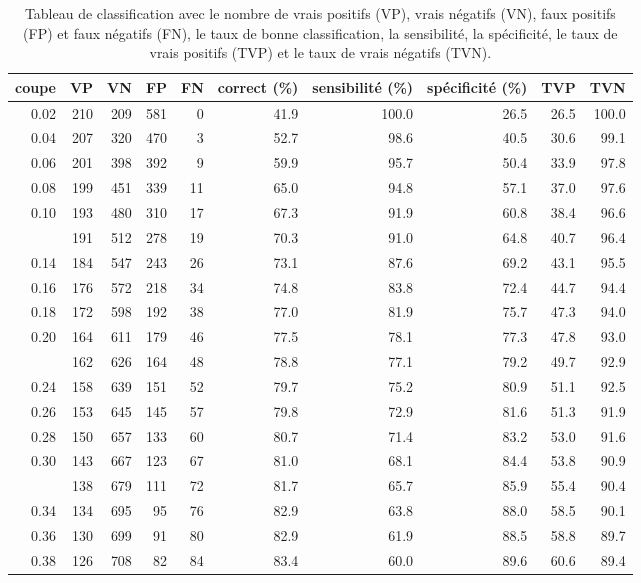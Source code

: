 \documentclass[
  11pt,
  letterpaper,
]{book}
\theoremstyle{definition}
\theoremstyle{remark}
\begin{document}
\hypertarget{tbl-classification-loocv}{}
\begin{longtable}{rrrrrrrrrr}
\caption{\label{tbl-classification-loocv}Tableau de classification avec le nombre de vrais positifs (VP), vrais
négatifs (VN), faux positifs (FP) et faux négatifs (FN), le taux de
bonne classification, la sensibilité, la spécificité, le taux de vrais
positifs (TVP) et le taux de vrais négatifs (TVN). }\tabularnewline

\toprule
coupe & VP & VN & FP & FN & correct (\%) & sensibilité (\%) & spécificité (\%) & TVP & TVN\\
\midrule
0.02 & 210 & 209 & 581 & 0 & 41.9 & 100.0 & 26.5 & 26.5 & 100.0\\
0.04 & 207 & 320 & 470 & 3 & 52.7 & 98.6 & 40.5 & 30.6 & 99.1\\
0.06 & 201 & 398 & 392 & 9 & 59.9 & 95.7 & 50.4 & 33.9 & 97.8\\
0.08 & 199 & 451 & 339 & 11 & 65.0 & 94.8 & 57.1 & 37.0 & 97.6\\
0.10 & 193 & 480 & 310 & 17 & 67.3 & 91.9 & 60.8 & 38.4 & 96.6\\
\addlinespace
0.12 & 191 & 512 & 278 & 19 & 70.3 & 91.0 & 64.8 & 40.7 & 96.4\\
0.14 & 184 & 547 & 243 & 26 & 73.1 & 87.6 & 69.2 & 43.1 & 95.5\\
0.16 & 176 & 572 & 218 & 34 & 74.8 & 83.8 & 72.4 & 44.7 & 94.4\\
0.18 & 172 & 598 & 192 & 38 & 77.0 & 81.9 & 75.7 & 47.3 & 94.0\\
0.20 & 164 & 611 & 179 & 46 & 77.5 & 78.1 & 77.3 & 47.8 & 93.0\\
\addlinespace
0.22 & 162 & 626 & 164 & 48 & 78.8 & 77.1 & 79.2 & 49.7 & 92.9\\
0.24 & 158 & 639 & 151 & 52 & 79.7 & 75.2 & 80.9 & 51.1 & 92.5\\
0.26 & 153 & 645 & 145 & 57 & 79.8 & 72.9 & 81.6 & 51.3 & 91.9\\
0.28 & 150 & 657 & 133 & 60 & 80.7 & 71.4 & 83.2 & 53.0 & 91.6\\
0.30 & 143 & 667 & 123 & 67 & 81.0 & 68.1 & 84.4 & 53.8 & 90.9\\
\addlinespace
0.32 & 138 & 679 & 111 & 72 & 81.7 & 65.7 & 85.9 & 55.4 & 90.4\\
0.34 & 134 & 695 & 95 & 76 & 82.9 & 63.8 & 88.0 & 58.5 & 90.1\\
0.36 & 130 & 699 & 91 & 80 & 82.9 & 61.9 & 88.5 & 58.8 & 89.7\\
0.38 & 126 & 708 & 82 & 84 & 83.4 & 60.0 & 89.6 & 60.6 & 89.4\\

\end{longtable}
\end{document}
